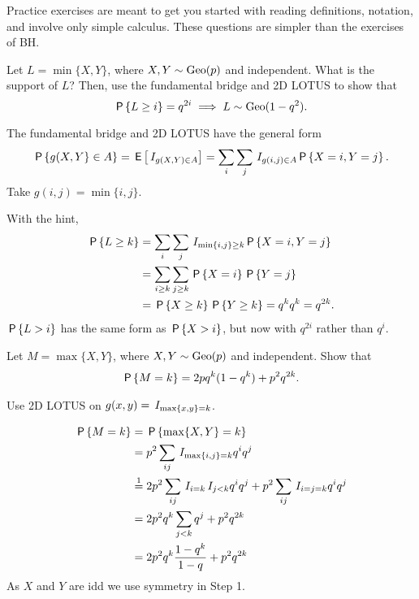 Practice exercises are meant to get you started with reading definitions, notation, and involve only simple calculus.
These questions are simpler than the exercises of BH.

\begin{exercise}
Let $L=\min\{X, Y\}$, where $X, Y\sim \Geo{p}$ and independent.
What is the support of $L$? Then, use the fundamental bridge and 2D LOTUS to show that
\begin{equation*}
\P{L\geq i}=q^{2i} \implies L\sim\Geo{1-q^{2}}.
\end{equation*}
\begin{hint}
The fundamental bridge and 2D LOTUS have  the general form
\begin{equation*}
\P{g(X,Y}\in A\} = \E{\1{g(X, Y) \in A}} = \sum_{i}\sum_j \1{g(i, j)\in A} \P{X=i, Y=j}.
  \end{equation*}
Take  $g(i,j) = \min\{i, j\}$.
\end{hint}
\begin{solution}
With the hint,
  \begin{align*}
\P{L\geq k}
&= \sum_{i}\sum_{j} \1{\min\{i,j\}\geq k} \P{X=i, Y=j}\\
&= \sum_{i\geq k} \sum_{j\geq k} \P{X=i}\P{Y=j}\\
&=  \P{X\geq k}\P{Y\geq k} = q^{k} q^{k} = q^{2k}.
  \end{align*}
$\P{L>i}$ has the same form as $\P{X>i}$, but now with $q^{2i}$ rather than $q^{i}$.
\end{solution}
\end{exercise}

\begin{exercise}\label{ex:1}
Let $M=\max\{X, Y\}$, where $X, Y\sim \Geo{p}$ and independent.
Show that
\begin{align*}
\P{M=k} = 2 pq^{k}(1-q^{k}) + p^2q^{2k}.
\end{align*}
\begin{hint}
  Use 2D LOTUS on $g(x,y) = \1{\max\{x, y\} = k}$.
\end{hint}
\begin{solution}
  \begin{align*}
\P{M=k}
&= \P{\max\{X, Y\} = k} \\
&=p^{2}\sum_{ij}\1{\max\{i,j\} =k} q^i q^j\\
&\stackrel{1}{=}2 p^{2}\sum_{ij}\1{i=k}\1{j < k} q^i q^j + p^{2}\sum_{ij}\1{i=j=k} q^{i} q^j \\
&=2 p^{2}q^{k}\sum_{j < k} q^j + p^{2}q^{2k}\\
&=2 p^{2}q^{k}\frac{1-q^{k}}{1-q} +  p^{2}q^{2k}\\
  \end{align*}
As $X$ and $Y$ are idd we use symmetry   in Step 1.
\end{solution}
\end{exercise}

